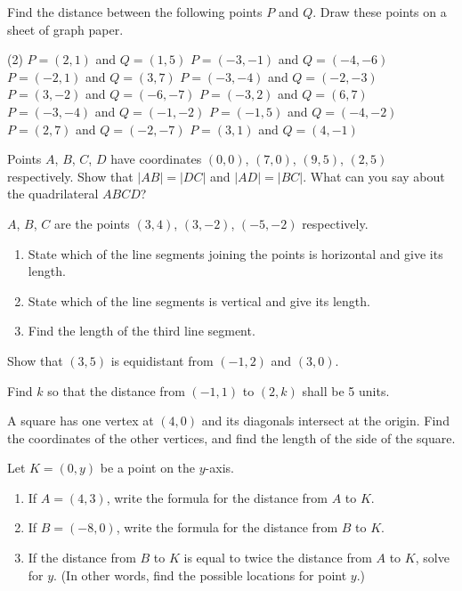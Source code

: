 \documentclass[12pt]{book} %
\begin{document}
\setcounter{Exercise}{0}
\begin{ExerciseList}
\Exercise Find the distance between the following points $P$ and $Q$. Draw these points on a sheet of graph paper.
\begin{tasks}(2)
\task[(1)] $P=(2,1)$ and $Q=(1,5)$
\task[(2)] $P=(-3,-1)$ and $Q=(-4,-6)$
\task[(3)] $P=(-2,1)$ and $Q=(3,7)$
\task[(4)] $P=(-3,-4)$ and $Q=(-2,-3)$
\task[(5)] $P=(3,-2)$ and $Q=(-6,-7)$
\task[(6)] $P=(-3,2)$ and $Q=(6,7)$
\task[(7)] $P=(-3,-4)$ and $Q=(-1,-2)$
\task[(8)] $P=(-1,5)$ and $Q=(-4,-2)$
\task[(9)] $P=(2,7)$ and $Q=(-2,-7)$
\task[(10)] $P=(3,1)$ and $Q=(4,-1)$
\end{tasks}

\Exercise Points $A$, $B$, $C$, $D$ have coordinates $(0,0)$, $(7,0)$, $(9,5)$, $(2,5)$ respectively. Show that $|AB|=|DC|$ and $|AD|=|BC|$. What can you say about the quadrilateral $ABCD$?

\Exercise $A$, $B$, $C$ are the points $(3,4)$, $(3,-2)$, $(-5,-2)$ respectively.
\begin{enumerate}
\item[(a)] State which of the line segments joining the points is horizontal and give its length.
\item[(b)] State which of the line segments is vertical and give its length.
\item[(c)] Find the length of the third line segment.
\end{enumerate}

\Exercise Show that $(3,5)$ is equidistant from $(-1,2)$ and $(3,0)$.

\Exercise Find $k$ so that the distance from $(-1,1)$ to $(2,k)$ shall be 5 units.

\Exercise A square has one vertex at $(4,0)$ and its diagonals intersect at the origin. Find the coordinates of the other vertices, and find the length of the side of the square.

\Exercise Let $K=(0,y)$ be a point on the $y$-axis.
\begin{enumerate}
\item[(a)] If $A=(4,3)$, write the formula for the distance from $A$ to $K$.
\item[(b)] If $B=(-8,0)$, write the formula for the distance from $B$ to $K$.
\item[(c)] If the distance from $B$ to $K$ is equal to twice the distance from $A$ to $K$, solve for $y$. (In other words, find the possible locations for point $y$.)
\end{enumerate}


\end{ExerciseList}
\end{document}
